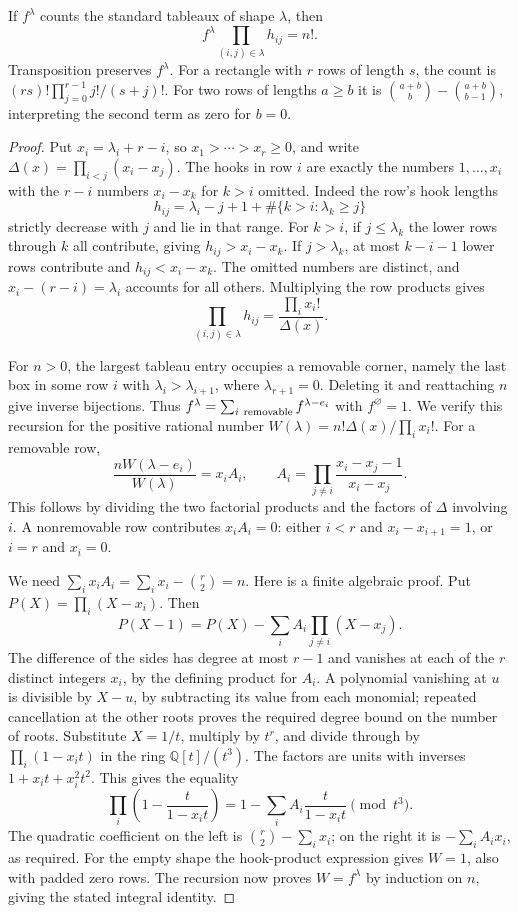 \begin{theorem}\label{result15}
If \(f^\lambda\) counts the standard tableaux of shape \(\lambda\), then
\[
 f^\lambda \prod_{(i,j)\in\lambda} h_{ij}=n!.
\]
Transposition preserves \(f^\lambda\). For a rectangle with \(r\) rows
of length \(s\), the count is \((rs)!\prod_{j=0}^{r-1} j!/(s+j)!\).
For two rows of lengths \(a\ge b\) it is
\(\binom{a+b}b-\binom{a+b}{b-1}\), interpreting the second term as zero
for \(b=0\).
\end{theorem}
\begin{proof}
Put \(x_i=\lambda_i+r-i\), so \(x_1>\cdots>x_r\ge0\), and write
\(\Delta(x)=\prod_{i<j}(x_i-x_j)\). The hooks in row \(i\) are exactly
the numbers \(1,\ldots,x_i\) with the \(r-i\) numbers \(x_i-x_k\)
for \(k>i\) omitted. Indeed the row's hook lengths
\[
 h_{ij}=\lambda_i-j+1+\#\{k>i:\lambda_k\ge j\}
\]
strictly decrease with \(j\) and lie in that range. For \(k>i\), if
\(j\le\lambda_k\) the lower rows through \(k\) all contribute, giving
\(h_{ij}>x_i-x_k\). If \(j>\lambda_k\), at most \(k-i-1\) lower rows
contribute and \(h_{ij}<x_i-x_k\). The omitted numbers are distinct,
and \(x_i-(r-i)=\lambda_i\) accounts for all others. Multiplying the row
products gives
\[
 \prod_{(i,j)\in\lambda}h_{ij}=\frac{\prod_i x_i!}{\Delta(x)}.
\]

For \(n>0\), the largest tableau entry occupies a removable corner,
namely the last box in some row \(i\) with
\(\lambda_i>\lambda_{i+1}\), where \(\lambda_{r+1}=0\).
Deleting it and reattaching \(n\) give inverse bijections. Thus
\(f^\lambda=\sum_{i\ {\rm removable}} f^{\lambda-e_i}\) with
\(f^\varnothing=1\). We verify this recursion for the positive rational
number \(W(\lambda)=n!\Delta(x)/\prod_i x_i!\). For a removable row,
\[
 \frac{nW(\lambda-e_i)}{W(\lambda)}=x_i A_i,\qquad
 A_i=\prod_{j\ne i}\frac{x_i-x_j-1}{x_i-x_j}.
\]
This follows by dividing the two factorial products and the factors of
\(\Delta\) involving \(i\). A nonremovable row contributes \(x_iA_i=0\):
either \(i<r\) and \(x_i-x_{i+1}=1\), or \(i=r\) and \(x_i=0\).

We need \(\sum_i x_iA_i=\sum_i x_i-\binom r2=n\). Here is a finite
algebraic proof. Put \(P(X)=\prod_i(X-x_i)\). Then
\[
 P(X-1)=P(X)-\sum_i A_i\prod_{j\ne i}(X-x_j).
\]
The difference of the sides has degree at most \(r-1\) and vanishes at
each of the \(r\) distinct integers \(x_i\), by the defining product for
\(A_i\). A polynomial vanishing at \(u\) is divisible by \(X-u\),
by subtracting its value from each monomial; repeated cancellation
at the other roots proves the required degree bound on the number of
roots. Substitute \(X=1/t\), multiply by \(t^r\), and divide through
by \(\prod_i(1-x_it)\) in the ring \(\mathbb Q[t]/(t^3)\). The factors
are units with inverses \(1+x_it+x_i^2t^2\). This gives the equality
\[
 \prod_i\left(1-\frac{t}{1-x_i t}\right)
   =1-\sum_i A_i \frac{t}{1-x_i t}\pmod{t^3}.
\]
The quadratic coefficient on the left is \(\binom r2-\sum_i x_i\);
on the right it is \(-\sum_i A_i x_i\), as required. For the empty
shape the hook-product expression gives \(W=1\), also with padded
zero rows. The recursion now proves \(W=f^\lambda\) by induction on
\(n\), giving the stated integral identity.


\end{proof}
